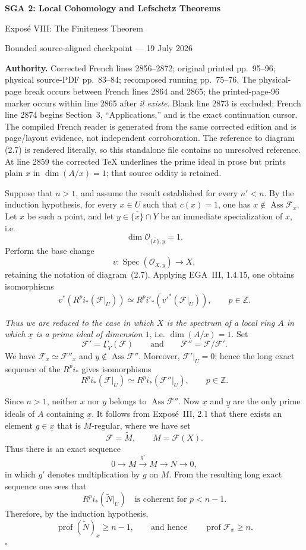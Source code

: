 \documentclass[10pt,a4paper]{article}
\newcommand{\cF}{\mathcal F}
\newcommand{\cO}{\mathcal O}
\newcommand{\SheafGamma}{\underline{\Gamma}}
\newcommand{\prof}{\operatorname{prof}}
\newcommand{\Ass}{\operatorname{Ass}}
\newcommand{\Spec}{\operatorname{Spec}}
\begin{document}
\begin{center}
  {\Large\bfseries SGA 2: Local Cohomology and Lefschetz Theorems}\par\smallskip
  {\large Expos\'e VIII: The Finiteness Theorem}\par
  \small Bounded source-aligned checkpoint --- 19 July 2026
\end{center}
\noindent\colorbox{softgray}{\parbox{0.95\linewidth}{\footnotesize\textbf{Authority.}
Corrected French lines 2856--2872; original printed pp.~95--96; physical
source-PDF pp.~83--84; recomposed running pp.~75--76. The physical-page
break occurs between French lines 2864 and 2865; the printed-page-96 marker
occurs within line 2865 after \emph{il existe}. Blank line 2873 is excluded;
French line 2874 begins
Section~3, ``Applications,'' and is the exact continuation cursor. The
compiled French reader is generated from the same corrected edition and is
page/layout evidence, not independent corroboration. The reference to
diagram (2.7) is rendered literally, so this standalone file contains no
unresolved reference. At line 2859 the corrected TeX underlines
the prime ideal in prose but prints plain $x$ in $\dim(A/x)=1$; that source
oddity is retained.}}

\medskip
\noindent Suppose that $n>1$, and assume the result established for every
$n'<n$. By the induction hypothesis, for every $x\in U$ such that $c(x)=1$,
one has $x\notin\Ass\cF_x$. Let $x$ be such a point, and let
$y\in\overline{\{x\}}\cap Y$ be an immediate specialization of $x$, i.e.
\[
  \dim\cO_{\overline{\{x\}},y}=1.
\]
Perform the base change
\[
  v\colon\Spec(\cO_{X,y})\longrightarrow X,
\]
retaining the notation of diagram~\textup{(2.7)}. Applying EGA~III, 1.4.15,
one obtains isomorphisms
\[
  v^*(R^p i_*(\cF|_U))
  \simeq
  R^p i'_*(v'^*(\cF|_U)),
  \qquad p\in\mathbb Z.
\]

\noindent\emph{Thus we are reduced to the case in which $X$ is the spectrum
of a local ring $A$ in which $\underline{x}$ is a prime ideal of dimension
$1$}, i.e. $\dim(A/x)=1$. Set
\[
  \cF'=\SheafGamma_Y(\cF)
  \qquad\text{and}\qquad
  \cF''=\cF/\cF'.
\]
We have $\cF_x\simeq\cF''_x$ and $y\notin\Ass\cF''$. Moreover,
$\cF'|_U=0$; hence the long exact sequence of the $R^p i_*$ gives
isomorphisms
\[
  R^p i_*(\cF|_U)
  \simeq
  R^p i_*(\cF''|_U),
  \qquad p\in\mathbb Z.
\]

\quad Since $n>1$,
neither $x$ nor $y$ belongs to $\Ass\cF''$. Now $\underline{x}$ and
$\underline{y}$ are the only prime ideals of $A$ containing $\underline{x}$.
It follows from Expos\'e~III, 2.1 that there exists an element
$g\in\underline{x}$ that is $M$-regular, where we have set
\[
  \cF=\widetilde M,
  \qquad M=\cF(X).
\]
Thus there is an exact sequence
\[
  0\longrightarrow M\xrightarrow{g'}M\longrightarrow N\longrightarrow0,
\]
in which $g'$ denotes multiplication by $g$ on $M$. From the resulting long
exact sequence one sees that
\[
  R^p i_*(\widetilde N|_U)
  \quad\text{is coherent for }p<n-1.
\]
Therefore, by the induction hypothesis,
\[
  \prof(\widetilde N)_x\geq n-1,
  \qquad\text{and hence}\qquad
  \prof\cF_x\geq n.
\]
\hfill$\square$
\end{document}
